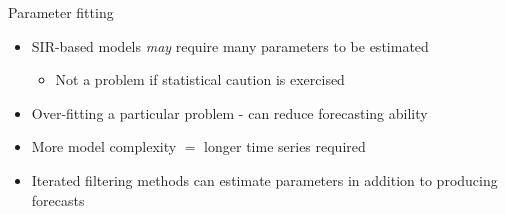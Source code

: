 \documentclass[11pt,compress,aspectratio=1610]{beamer}
\begin{document}
\begin{frame}{Parameter fitting}
\begin{itemize}
    \item SIR-based models {\it may} require many parameters to be estimated
    \begin{itemize}
    	\item Not a problem if statistical caution is exercised
    \end{itemize}
    \item Over-fitting a particular problem - can reduce forecasting ability
    \item More model complexity $=$ longer time series required
    \item Iterated filtering methods can estimate parameters in addition to producing forecasts
\end{itemize}
\end{frame}
\end{document}
